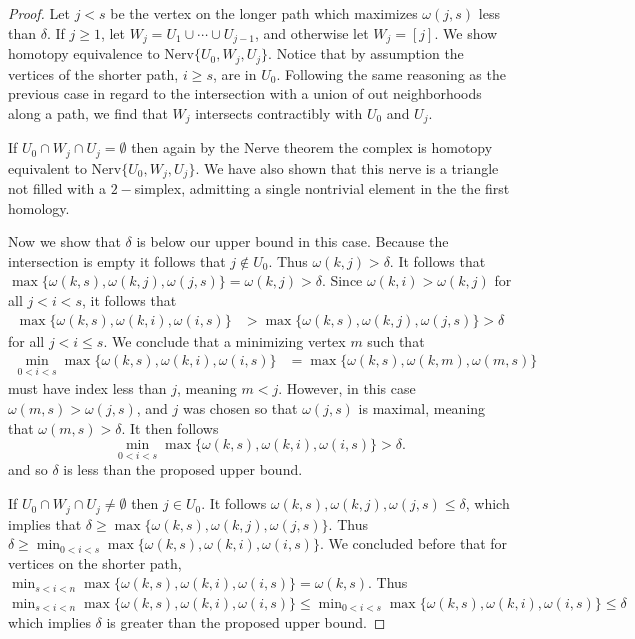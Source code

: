 \documentclass[pdflatex,bst/sn-mathphys-num]{sn-jnl}%
\theoremstyle{thmstyleone}%
\theoremstyle{definition}
\theoremstyle{thmstyletwo}%
\theoremstyle{thmstylethree}%
\begin{document}
\begin{proof}
     Let $j<s$ be the vertex on the longer path which maximizes $\omega(j,s)$ less than $\delta$. If $j\geq 1$, let $W_j=U_1\cup \cdots \cup U_{j-1}$, and otherwise let $W_j=[j]$. We show homotopy equivalence to Nerv$\{U_0,W_j,U_j\}$. Notice that by assumption the vertices of the shorter path, $i\geq s$, are in $U_0$. Following the same reasoning as the previous case in regard to the intersection with a union of out neighborhoods along a path, we find that $W_j$ intersects contractibly with $U_0$ and $U_j$.

    If $U_0\cap W_j\cap U_j=\emptyset$ then again by the Nerve theorem the complex is homotopy equivalent to Nerv$\{U_0,W_j,U_j\}$. We have also shown that this nerve is a triangle not filled with a $2-$simplex, admitting a single nontrivial element in the the first homology.
    
    Now we show that $\delta$ is below our upper bound in this case. Because the intersection is empty it follows that $j\not\in U_0$. Thus $\omega(k,j)>\delta$. It follows that $\max\{\omega(k,s),\omega(k,j),\omega(j,s)\}=\omega(k,j)>\delta$. Since  $ \omega(k,i)>\omega(k,j)$ for all $j<i<s$, it follows that
    \begin{align*}
        \max\{\omega(k,s),\omega(k,i),\omega(i,s)\}&>\max\{\omega(k,s),\omega(k,j),\omega(j,s)\}>\delta
    \end{align*}
    for all $j<i\leq s$. We conclude that a minimizing vertex $m$ such that
    \begin{align*}
        \min_{0<i<s}\max\{\omega(k,s),\omega(k,i),\omega(i,s)\}&=\max\{\omega(k,s),\omega(k,m),\omega(m,s)\}
    \end{align*}
    must have index less than $j$, meaning $m<j$. However, in this case $\omega(m,s)>\omega(j,s)$, and $j$ was chosen so that $\omega(j,s)$ is maximal, meaning that $\omega(m,s)>\delta$. It then follows 
    \[
    \min_{0<i<s}\max\{\omega(k,s),\omega(k,i),\omega(i,s)\}>\delta.
    \]
     and so $\delta$ is less than the proposed upper bound.
    
     If $U_0\cap W_j\cap U_j\neq \emptyset$ then $j\in U_0$. It follows $\omega(k,s),\omega(k,j),\omega(j,s)\leq \delta$, which implies that $\delta\geq \max\{\omega(k,s),\omega(k,j),\omega(j,s)\}$. Thus $\delta\geq \min_{0<i<s}\max\{\omega(k,s),\omega(k,i),\omega(i,s)\}$. We concluded before that for vertices on the shorter path, $\min_{s<i<n}\max\{\omega(k,s),\omega(k,i),\omega(i,s)\}=\omega(k,s)$. Thus $\min_{s<i<n}\max\{\omega(k,s),\omega(k,i),\omega(i,s)\}\leq \min_{0<i<s}\max\{\omega(k,s),\omega(k,i),\omega(i,s)\}\leq \delta$ which implies $\delta$ is greater than the proposed upper bound.
\end{proof}
\end{document}
